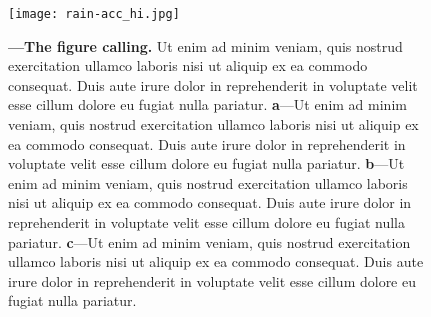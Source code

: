 \begin{figure}[t!] %
\centering
\texttt{[image: rain-acc\_hi.jpg]}
\caption[Caption for display in the LOF]
{
    \textbf{ ---\;The figure calling.}
    Ut enim ad minim veniam, quis nostrud exercitation ullamco laboris nisi ut aliquip ex ea commodo consequat. Duis aute irure dolor in reprehenderit in voluptate velit esse cillum dolore eu fugiat nulla pariatur.
    \;\textbf{a}\;---\;Ut enim ad minim veniam, quis nostrud exercitation ullamco laboris nisi ut aliquip ex ea commodo consequat. Duis aute irure dolor in reprehenderit in voluptate velit esse cillum dolore eu fugiat nulla pariatur.
    \;\textbf{b}\;---\;Ut enim ad minim veniam, quis nostrud exercitation ullamco laboris nisi ut aliquip ex ea commodo consequat. Duis aute irure dolor in reprehenderit in voluptate velit esse cillum dolore eu fugiat nulla pariatur.
    \;\textbf{c}\;---\;Ut enim ad minim veniam, quis nostrud exercitation ullamco laboris nisi ut aliquip ex ea commodo consequat. Duis aute irure dolor in reprehenderit in voluptate velit esse cillum dolore eu fugiat nulla pariatur.
}
\label{fig:label} 		
\end{figure}
